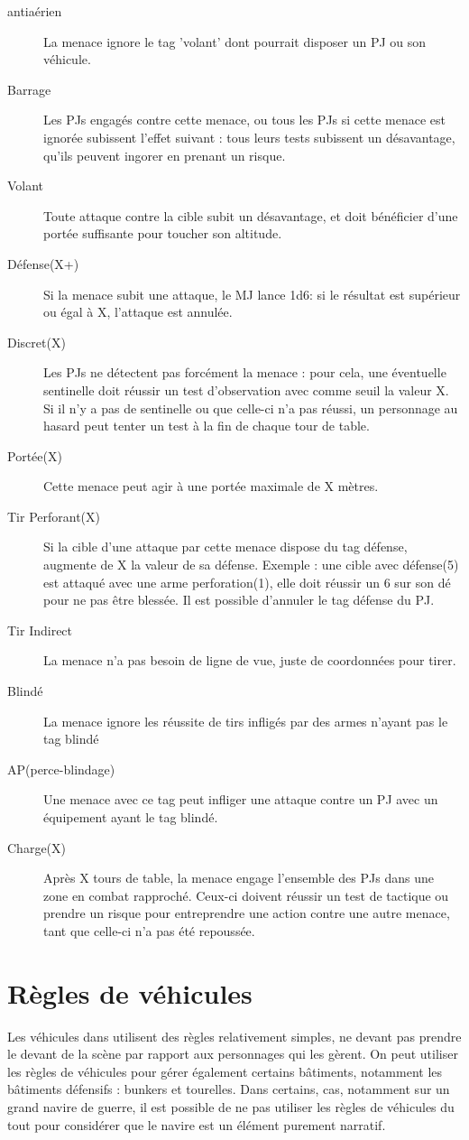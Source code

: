 \documentclass{report}
\begin{document}
\begin{multicols}{2}
\begin{description}
\item[antiaérien]La menace ignore le tag 'volant' dont pourrait disposer un PJ ou son véhicule.
\item[Barrage]Les PJs engagés contre cette menace, ou tous les PJs si cette menace est ignorée subissent l'effet suivant : tous leurs tests subissent un désavantage, qu'ils peuvent ingorer en prenant un risque.
\item[Volant] Toute attaque contre la cible subit un désavantage, et doit bénéficier d'une portée suffisante pour toucher son altitude.
\item[Défense(X+)] Si la menace subit une attaque, le MJ lance 1d6: si le résultat est supérieur ou égal à X, l'attaque est annulée.
\item[Discret(X)] Les PJs ne détectent pas forcément la menace : pour cela, une éventuelle sentinelle doit réussir un test d'observation avec comme seuil la valeur X. Si il n'y a pas de sentinelle ou que celle-ci n'a pas réussi, un personnage au hasard peut tenter un test à la fin de chaque tour de table.
\item[Portée(X)]Cette menace peut agir à une portée maximale de X mètres.
\item[Tir Perforant(X)] Si la cible d'une attaque par cette menace dispose du tag défense, augmente de X la valeur de sa défense. Exemple : une cible avec défense(5) est attaqué avec une arme perforation(1), elle doit réussir un 6 sur son dé pour ne pas être blessée. Il est possible d'annuler le tag défense du PJ.
\item[Tir Indirect]La menace n'a pas besoin de ligne de vue, juste de coordonnées pour tirer.
\item[Blindé] La menace ignore les réussite de tirs infligés par des armes n'ayant pas le tag blindé
\item[AP(perce-blindage)]Une menace avec ce tag peut infliger une attaque contre un PJ avec un équipement ayant le tag blindé.
\item[Charge(X)]Après X tours de table, la menace engage l'ensemble des PJs dans une zone en combat rapproché. Ceux-ci doivent réussir un test de tactique ou prendre un risque pour entreprendre une action contre une autre menace, tant que celle-ci n'a pas été repoussée.
\end{description}
\section{Règles de véhicules}
Les véhicules dans \diminutif utilisent des règles relativement simples, ne devant pas prendre le devant de la scène par rapport aux personnages qui les gèrent. On peut utiliser les règles de véhicules pour gérer également certains bâtiments, notamment les bâtiments défensifs : bunkers et tourelles. Dans certains, cas, notamment sur un grand navire de guerre, il est possible de ne pas utiliser les règles de véhicules du tout pour considérer que le navire est un élément purement narratif.


\end{multicols}
\end{document}
